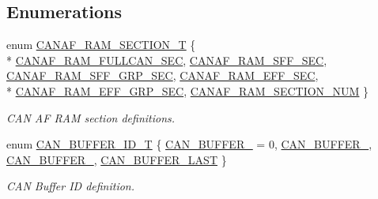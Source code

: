 \subsection*{Enumerations}
\begin{DoxyCompactItemize}
\item 
enum \hyperlink{group__CAN__17XX__40XX_gaf0ae33e71a7acfc561972811aa1207e8}{C\-A\-N\-A\-F\-\_\-\-R\-A\-M\-\_\-\-S\-E\-C\-T\-I\-O\-N\-\_\-\-T} \{ \\*
\hyperlink{group__CAN__17XX__40XX_ggaf0ae33e71a7acfc561972811aa1207e8abe9837dc35bd06778ce14557fb60c0d6}{C\-A\-N\-A\-F\-\_\-\-R\-A\-M\-\_\-\-F\-U\-L\-L\-C\-A\-N\-\_\-\-S\-E\-C}, 
\hyperlink{group__CAN__17XX__40XX_ggaf0ae33e71a7acfc561972811aa1207e8a3fbfc3b49a65a73278b5fe4a392c38f7}{C\-A\-N\-A\-F\-\_\-\-R\-A\-M\-\_\-\-S\-F\-F\-\_\-\-S\-E\-C}, 
\hyperlink{group__CAN__17XX__40XX_ggaf0ae33e71a7acfc561972811aa1207e8a6f0abb002e71440f460a50f5d9a67af7}{C\-A\-N\-A\-F\-\_\-\-R\-A\-M\-\_\-\-S\-F\-F\-\_\-\-G\-R\-P\-\_\-\-S\-E\-C}, 
\hyperlink{group__CAN__17XX__40XX_ggaf0ae33e71a7acfc561972811aa1207e8a1d1b4c4406c8913e08d9edba297f9d34}{C\-A\-N\-A\-F\-\_\-\-R\-A\-M\-\_\-\-E\-F\-F\-\_\-\-S\-E\-C}, 
\\*
\hyperlink{group__CAN__17XX__40XX_ggaf0ae33e71a7acfc561972811aa1207e8a3a869c6db7177da7b55a903b051775c1}{C\-A\-N\-A\-F\-\_\-\-R\-A\-M\-\_\-\-E\-F\-F\-\_\-\-G\-R\-P\-\_\-\-S\-E\-C}, 
\hyperlink{group__CAN__17XX__40XX_ggaf0ae33e71a7acfc561972811aa1207e8a367c14b1175c83cd2ed218b1cb23b010}{C\-A\-N\-A\-F\-\_\-\-R\-A\-M\-\_\-\-S\-E\-C\-T\-I\-O\-N\-\_\-\-N\-U\-M}
 \}
\begin{DoxyCompactList}\small\item\em C\-A\-N A\-F R\-A\-M section definitions. \end{DoxyCompactList}\item 
enum \hyperlink{group__CAN__17XX__40XX_ga073d4792bdf9dd0d8ceda6b8c3752dd9}{C\-A\-N\-\_\-\-B\-U\-F\-F\-E\-R\-\_\-\-I\-D\-\_\-\-T} \{ \hyperlink{group__CAN__17XX__40XX_gga073d4792bdf9dd0d8ceda6b8c3752dd9a4676dbb752485410e03d6b995983faf9}{C\-A\-N\-\_\-\-B\-U\-F\-F\-E\-R\-\_} = 0, 
\hyperlink{group__CAN__17XX__40XX_gga073d4792bdf9dd0d8ceda6b8c3752dd9a23a79343fe82a5c1b6b58d6c5cd5a656}{C\-A\-N\-\_\-\-B\-U\-F\-F\-E\-R\-\_}, 
\hyperlink{group__CAN__17XX__40XX_gga073d4792bdf9dd0d8ceda6b8c3752dd9a88d946b80f354f8d7dc216c017b9d1ce}{C\-A\-N\-\_\-\-B\-U\-F\-F\-E\-R\-\_}, 
\hyperlink{group__CAN__17XX__40XX_gga073d4792bdf9dd0d8ceda6b8c3752dd9a636fb6eb431d35079351e9ac16b3b8a8}{C\-A\-N\-\_\-\-B\-U\-F\-F\-E\-R\-\_\-\-L\-A\-S\-T}
 \}
\begin{DoxyCompactList}\small\item\em C\-A\-N Buffer I\-D definition. \end{DoxyCompactList}\item 

\end{DoxyCompactItemize}
